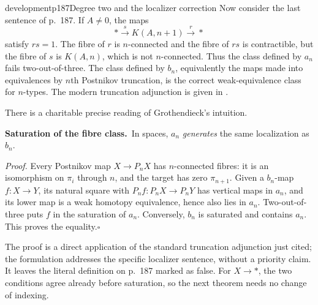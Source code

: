 \begin{dcomment}{development}{p187}{Degree two and the localizer correction}
Now consider the last sentence of p.~187. If $A\ne0$, the maps
\[
 *\xrightarrow{s}K(A,n+1)\xrightarrow{r}*
\]
satisfy $rs=1$. The fibre of $r$ is $n$-connected and the fibre of $rs$ is contractible, but the fibre of $s$ is $K(A,n)$, which is not $n$-connected. Thus the class defined by $a_n$ fails two-out-of-three. The class defined by $b_n$, equivalently the maps made into equivalences by $n$th Postnikov truncation, is the correct weak-equivalence class for $n$-types. The modern truncation adjunction is given in \citet[Proposition~5.5.6.18]{Lurie2009HTT}.

There is a charitable precise reading of Grothendieck's intuition.

\textbf{Saturation of the fibre class.}\ours\ In spaces, $a_n$ \emph{generates} the same localization as $b_n$.

\textit{Proof.} Every Postnikov map $X\to P_nX$ has $n$-connected fibres: it is an isomorphism on $\pi_i$ through $n$, and the target has zero $\pi_{n+1}$. Given a $b_n$-map $f:X\to Y$, its natural square with $P_nf:P_nX\to P_nY$ has vertical maps in $a_n$, and its lower map is a weak homotopy equivalence, hence also lies in $a_n$. Two-out-of-three puts $f$ in the saturation of $a_n$. Conversely, $b_n$ is saturated and contains $a_n$. This proves the equality.\hfill$\square$

The proof is a direct application of the standard truncation adjunction just cited; the formulation addresses the specific localizer sentence, without a priority claim. It leaves the literal definition on p.~187 marked as false. For $X\to *$, the two conditions agree already before saturation, so the next theorem needs no change of indexing.
\end{dcomment}

